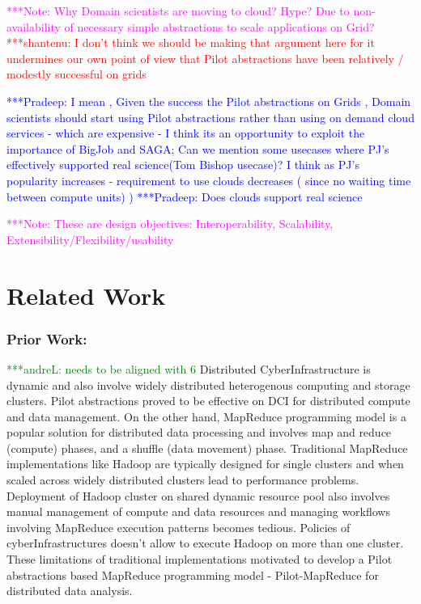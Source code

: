 \documentclass[times]{cpeauth}
\newcommand{\jhanote}[1]{ {\textcolor{red} { ***shantenu: #1 }}}
\newcommand{\alnote}[1]{ {\textcolor{green} { ***andreL: #1 }}}
\newcommand{\pmnote}[1]{ {\textcolor{blue} { ***Pradeep: #1 }}}
\newcommand{\note}[1]{ {\textcolor{magenta} { ***Note: #1 }}}
\newcommand{\alnote}[1]{}
\newcommand{\pmnote}[1]{}
\newcommand{\jhanote}[1]{}
\newcommand{\note}[1]{}
\begin{document}
\note{Why Domain scientists are moving to cloud? Hype? Due to
  non-availability of necessary simple abstractions to scale
  applications on Grid?} \jhanote{I don't think we should be making
    that argument here for it undermines our own point of view that
    Pilot abstractions have been relatively / modestly successful on
    grids}

\pmnote{ I mean , Given the success the Pilot abstractions on Grids , Domain scientists should start using Pilot abstractions rather than using on demand cloud services - which are expensive - I think its an opportunity to exploit the importance of BigJob and SAGA;  Can we mention some usecases where PJ's effectively supported real science(Tom Bishop usecase)? 
I think as PJ's popularity increases - requirement to use clouds decreases ( since no waiting time between compute units) )}
\pmnote{Does clouds support real science}

\note{These are design objectives: Interoperability, Scalability,
  Extensibility/Flexibility/usability}





\section{Related Work}

\subsubsection*{Prior Work:}
\alnote{needs to be aligned with 6}
Distributed CyberInfrastructure is dynamic and also involve widely distributed
heterogenous computing and storage clusters. Pilot abstractions proved to be
effective on DCI for distributed compute and data management. On the other
hand, MapReduce programming model is a popular solution for distributed data
processing and involves map and reduce (compute) phases, and a shuffle (data
movement) phase. Traditional MapReduce implementations like Hadoop are
typically designed for single clusters and when scaled across widely
distributed clusters lead to performance problems. Deployment of Hadoop
cluster on shared dynamic resource pool also involves manual management of
compute and data resources and managing workflows involving MapReduce
execution patterns becomes tedious. Policies of cyberInfrastructures doesn't
allow to execute Hadoop on more than one cluster. These limitations of
traditional implementations motivated to develop a Pilot abstractions based
MapReduce programming model - Pilot-MapReduce for distributed data analysis.
\end{document}
